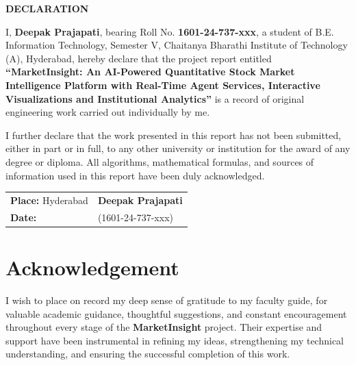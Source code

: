 \documentclass[12pt,a4paper]{report}
\begin{document}
\clearpage
\thispagestyle{empty}
\begin{center}
  {\LARGE\bfseries\color{cbitred} DECLARATION}
\end{center}
\vspace{1cm}

\onehalfspacing
I, \textbf{Deepak Prajapati}, bearing Roll No. \textbf{1601-24-737-xxx}, a student of B.E. Information Technology, Semester V, Chaitanya Bharathi Institute of Technology (A), Hyderabad, hereby declare that the project report entitled \textbf{``MarketInsight: An AI-Powered Quantitative Stock Market Intelligence Platform with Real-Time Agent Services, Interactive Visualizations and Institutional Analytics''} is a record of original engineering work carried out individually by me.

I further declare that the work presented in this report has not been submitted, either in part or in full, to any other university or institution for the award of any degree or diploma. All algorithms, mathematical formulas, and sources of information used in this report have been duly acknowledged.

\vspace{2.5cm}

\noindent
\begin{tabular}{ll}
  \textbf{Place:} Hyderabad & \hspace{6cm} \textbf{Deepak Prajapati} \\
  \textbf{Date:}  & \hspace{6cm} (1601-24-737-xxx)
\end{tabular}

\clearpage
\chapter*{Acknowledgement}
\setcounter{page}{3}

\onehalfspacing

I wish to place on record my deep sense of gratitude to my faculty guide, for valuable academic guidance, thoughtful suggestions, and constant encouragement throughout every stage of the \textbf{MarketInsight} project. Their expertise and support have been instrumental in refining my ideas, strengthening my technical understanding, and ensuring the successful completion of this work.
\end{document}
